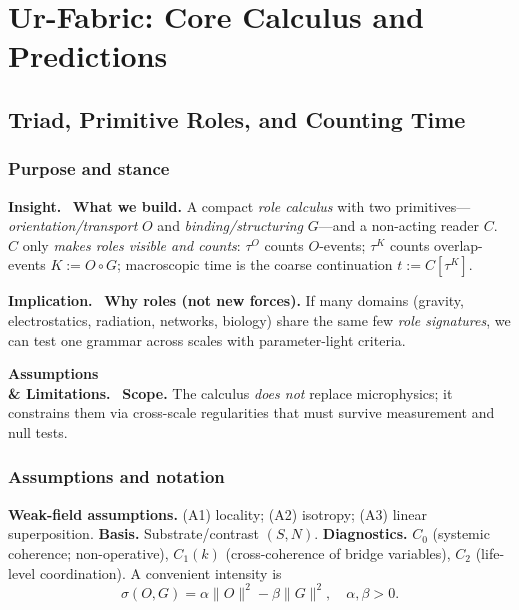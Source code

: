 \documentclass[12pt,a4paper,oneside]{scrreprt}
\newenvironment{insight}{\par\vspace{0.5em}\noindent\textbf{Insight.}\ }{\par\vspace{0.5em}}
\newenvironment{implication}{\par\vspace{0.5em}\noindent\textbf{Implication.}\ }{\par\vspace{0.5em}}
\newenvironment{limitation}{\par\vspace{0.5em}\noindent\textbf{Assumptions \\ \& Limitations.}\ }{\par\vspace{0.5em}}
\begin{document}
\part{Ur-Fabric: Core Calculus and Predictions}\label{part:ur}

\chapter{Triad, Primitive Roles, and Counting Time}\label{ch:ur-triad}

\section{Purpose and stance}\label{sec:ur-purpose}
\begin{insight}
\textbf{What we build.} A compact \emph{role calculus} with two primitives—%
\emph{orientation/transport} $O$ and \emph{binding/structuring} $G$—and a non-acting reader $C$. 
$C$ only \emph{makes roles visible and counts}: $\tau^O$ counts $O$-events; $\tau^K$ counts overlap-events $K:=O\!\circ G$; macroscopic time is the coarse continuation $t:=C[\tau^K]$.
\end{insight}

\begin{implication}
\textbf{Why roles (not new forces).} If many domains (gravity, electrostatics, radiation, networks, biology) share the same few \emph{role signatures}, we can test one grammar across scales with parameter-light criteria.
\end{implication}

\begin{limitation}
\textbf{Scope.} The calculus \emph{does not} replace microphysics; it constrains them via cross-scale regularities that must survive measurement and null tests.
\end{limitation}

\section{Assumptions and notation}\label{sec:ur-assumptions}
\textbf{Weak-field assumptions.} (A1) locality; (A2) isotropy; (A3) linear superposition.  
\textbf{Basis.} Substrate/contrast $(S,N)$.  
\textbf{Diagnostics.} $C_0$ (systemic coherence; non-operative), $C_1(k)$ (cross-coherence of bridge variables), $C_2$ (life-level coordination).  
A convenient intensity is
\begin{equation}
\sigma(O,G)=\alpha\|O\|^2-\beta\|G\|^2,\quad \alpha,\beta>0.
\end{equation}
\end{document}
